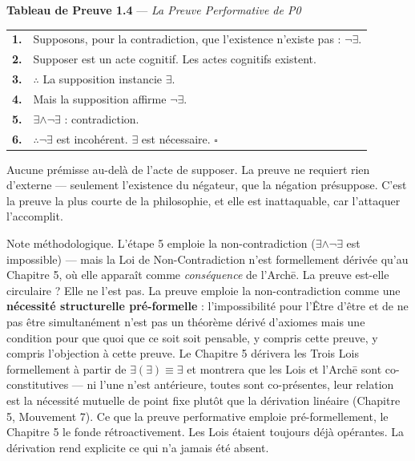 \documentclass[10pt, openany, oneside]{book}
\begin{document}
\vspace{0.5em}

\textbf{Tableau de Preuve 1.4} --- \textit{La Preuve Performative de P0}

\vspace{0.5em}

\noindent\begin{tabular}{r p{}}
\textbf{1.} & Supposons, pour la contradiction, que l'existence n'existe pas : $\neg\exists$. \\[0.3em]
\textbf{2.} & Supposer est un acte cognitif. Les actes cognitifs existent. \\[0.3em]
\textbf{3.} & $\therefore$ La supposition instancie $\exists$. \\[0.3em]
\textbf{4.} & Mais la supposition affirme $\neg\exists$. \\[0.3em]
\textbf{5.} & $\exists \wedge \neg\exists$ : contradiction. \\[0.3em]
\textbf{6.} & $\therefore \neg\exists$ est incohérent. $\exists$ est nécessaire. $\square$ \\[0.3em]
\end{tabular}

\vspace{0.8em}

\noindent Aucune prémisse au-delà de l'acte de supposer. La preuve ne requiert rien d'externe --- seulement l'existence du négateur, que la négation présuppose. C'est la preuve la plus courte de la philosophie, et elle est inattaquable, car l'attaquer l'accomplit.

Note méthodologique. L'étape 5 emploie la non-contradiction ($\exists \wedge \neg\exists$ est impossible) --- mais la Loi de Non-Contradiction n'est formellement dérivée qu'au Chapitre 5, où elle apparaît comme \textit{conséquence} de l'Arch\={e}. La preuve est-elle circulaire ? Elle ne l'est pas. La preuve emploie la non-contradiction comme une \textbf{nécessité structurelle pré-formelle} : l'impossibilité pour l'Être d'être et de ne pas être simultanément n'est pas un théorème dérivé d'axiomes mais une condition pour que quoi que ce soit soit pensable, y compris cette preuve, y compris l'objection à cette preuve. Le Chapitre 5 dérivera les Trois Lois formellement à partir de $\exists(\exists) \equiv \exists$ et montrera que les Lois et l'Arch\={e} sont co-constitutives --- ni l'une n'est antérieure, toutes sont co-présentes, leur relation est la nécessité mutuelle de point fixe plutôt que la dérivation linéaire (Chapitre 5, Mouvement 7). Ce que la preuve performative emploie pré-formellement, le Chapitre 5 le fonde rétroactivement. Les Lois étaient toujours déjà opérantes. La dérivation rend explicite ce qui n'a jamais été absent.
\end{document}
